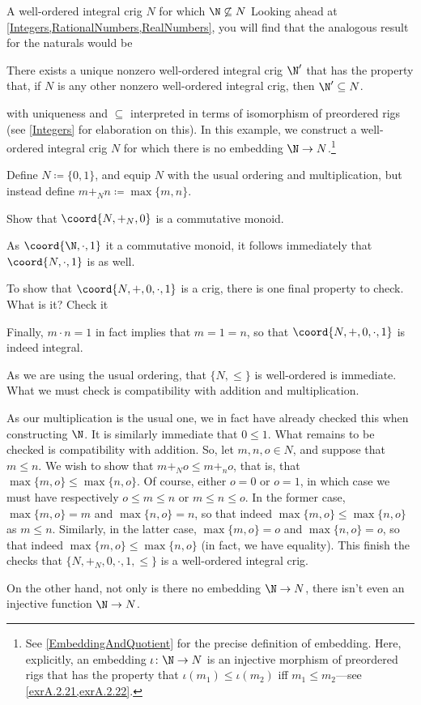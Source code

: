 \begin{exm}{A well-ordered integral crig $N$ for which $\N \not \subseteq N$}{}
Looking ahead at \cref{Integers,RationalNumbers,RealNumbers}, you will find that the analogous result for the naturals would be
\begin{displayquote}
There exists a unique nonzero well-ordered integral crig $\N '$ that has the property that, if $N$ is any other nonzero well-ordered integral crig, then $\N '\subseteq N$.
\end{displayquote}
with uniqueness and $\subseteq$ interpreted in terms of isomorphism of preordered rigs (see \cref{Integers} for elaboration on this).  In this example, we construct a well-ordered integral crig $N$ for which there is no embedding $\N \rightarrow N$.\footnote{See \cref{EmbeddingAndQuotient} for the precise definition of embedding.  Here, explicitly, an embedding $\iota \colon \N \rightarrow N$ is an injective morphism of preordered rigs that has the property that $\iota (m_1)\leq \iota (m_2)$ iff $m_1\leq m_2$---see \cref{exrA.2.21,exrA.2.22}.}

Define $N\coloneqq \{ 0,1\}$, and equip $N$ with the usual ordering and multiplication, but instead define $m+_Nn\coloneqq \max \{ m,n\}$.
\begin{exr}[breakable=false]{}{}
Show that $\coord{N,+_N,0}$ is a commutative monoid.
\end{exr}
As $\coord{\N,\cdot ,1}$ it a commutative monoid, it follows immediately that $\coord{N,\cdot ,1}$ is as well.
\begin{exr}[breakable=false]{}{}
To show that $\coord{N ,+,0,\cdot ,1}$ is a crig, there is one final property to check.  What is it?  Check it
\end{exr}
Finally, $m\cdot n=1$ in fact implies that $m=1=n$, so that $\coord{N,+,0,\cdot ,1}$ is indeed integral.

As we are using the usual ordering, that $\{ N,\leq \}$ is well-ordered is immediate.  What we must check is compatibility with addition and multiplication.

As our multiplication is the usual one, we in fact have already checked this when constructing $\N$.  It is similarly immediate that $0\leq 1$.  What remains to be checked is compatibility with addition.  So, let $m,n,o\in N$, and suppose that $m\leq n$.  We wish to show that $m+_No\leq m+_no$, that is, that $\max \{ m,o\} \leq \max \{ n,o\}$.  Of course, either $o=0$ or $o=1$, in which case we must have respectively $o\leq m\leq n$ or $m\leq n\leq o$.  In the former case, $\max \{ m,o\} =m$ and $\max \{ n,o\} =n$, so that indeed $\max \{ m,o\} \leq \max \{ n,o\}$ as $m\leq n$.  Similarly, in the latter case, $\max \{ m,o\} =o$ and $\max \{ n,o\} =o$, so that indeed $\max \{ m,o\} \leq \max \{ n,o\}$ (in fact, we have equality).  This finish the checks that $\{ N,+_N,0,\cdot ,1,\leq\}$ is a well-ordered integral crig.

On the other hand, not only is there no embedding $\N \rightarrow N$, there isn't even an injective function $\N \rightarrow N$.
\end{exm}

